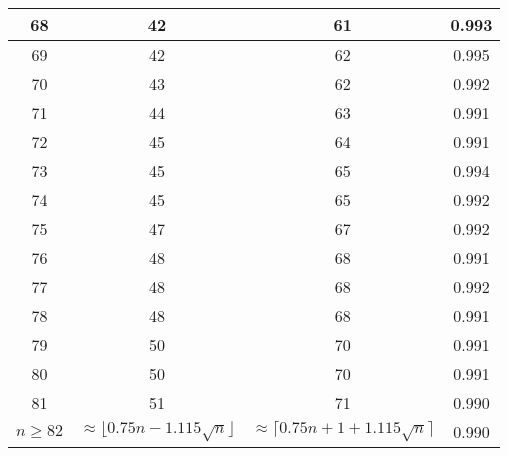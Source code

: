 \begin{table}
\begin{tabular}{|c|c|c|c|}
 68  & 42  & 61 & 0.993  \\ \hline
 69  & 42  & 62 & 0.995  \\ \hline
 70  & 43  & 62 & 0.992  \\ \hline
 71  & 44  & 63 & 0.991  \\ \hline
 72  & 45  & 64 & 0.991  \\ \hline
 73  & 45  & 65 & 0.994  \\ \hline
 74  & 45  & 65 & 0.992  \\ \hline
 75  & 47  & 67 & 0.992  \\ \hline
 76  & 48  & 68 & 0.991  \\ \hline
 77  & 48  & 68 & 0.992  \\ \hline
 78  & 48  & 68 & 0.991  \\ \hline
 79  & 50  & 70 & 0.991  \\ \hline
 80  & 50  & 70 & 0.991  \\ \hline
 81  & 51  & 71 & 0.990  \\ \hline
\hline $n \geq 82$ &
\multicolumn{1}{p{15mm}|}{$\approx \lfloor 0.75 n - 1.115 \sqrt{n}\rfloor$} &
\multicolumn{1}{p{15mm}|}{$\approx \lceil 0.75 n + 1 + 1.115 \sqrt{n}\rceil$} &
0.990 \\ \hline
\end{tabular}
 \hspace{2mm}
\end{table}


